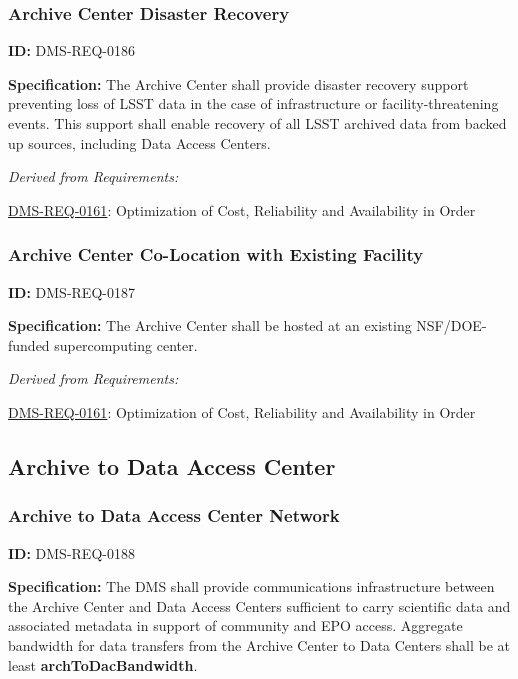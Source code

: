 \documentclass[SE,toc,lsstdraft]{lsstdoc}
\begin{document}
\subsubsection{Archive Center Disaster Recovery}

\label{DMS-REQ-0186}
\textbf{ID:} DMS-REQ-0186

\textbf{Specification:} The Archive Center shall provide disaster recovery support preventing loss of LSST data in the case of infrastructure or facility-threatening events.  This support shall enable recovery of all LSST archived data from backed up sources, including Data Access Centers.






\emph{Derived from Requirements:}

\hyperref[DMS-REQ-0161]{DMS-REQ-0161}:
Optimization of Cost, Reliability and Availability in Order \newline


\subsubsection{Archive Center Co-Location with Existing Facility}

\label{DMS-REQ-0187}
\textbf{ID:} DMS-REQ-0187

\textbf{Specification:} The Archive Center shall be hosted at an existing NSF/DOE-funded supercomputing center.






\emph{Derived from Requirements:}

\hyperref[DMS-REQ-0161]{DMS-REQ-0161}:
Optimization of Cost, Reliability and Availability in Order \newline


\subsection{Archive to Data Access Center}





\subsubsection{Archive to Data Access Center Network}

\label{DMS-REQ-0188}
\textbf{ID:} DMS-REQ-0188

\textbf{Specification:} The DMS shall provide communications infrastructure between the Archive Center and Data Access Centers sufficient to carry scientific data and associated metadata in support of community and EPO access. Aggregate bandwidth for data transfers from the Archive Center to Data Centers shall be at least \textbf{archToDacBandwidth}.
\end{document}
